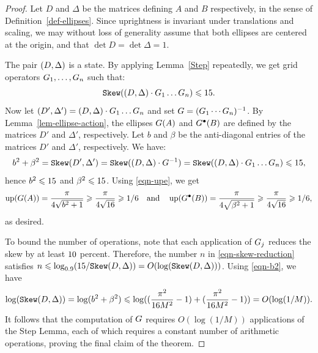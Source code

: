 \begin{proof}
  Let $D$ and $\Delta$ be the matrices defining $A$ and $B$
  respectively, in the sense of Definition~\ref{def-ellipses}. Since
  uprightness is invariant under translations and scaling, we may
  without loss of generality assume that both ellipses are centered at
  the origin, and that $\det D = \det \Delta = 1$.

  The pair $(D,\Delta)$ is a state. By applying Lemma~\ref{Step}
  repeatedly, we get grid operators $G_1,\ldots,G_n$ such that:
  \begin{equation}\label{eqn-skew-reduction}
    \sk(\state\cdot \G_1\ldots \G_n) \leq \formula{\P}.
  \end{equation}
  Now let $(D',\Delta')=(D,\Delta)\cdot G_1\ldots G_n$ and set
  $G=(G_1\cdots G_n)^{-1}$. By Lemma~\ref{lem-ellipse-action}, the
  ellipses $G(A)$ and $G^{\bullet}(B)$ are defined by the matrices
  $D'$ and $\Delta'$, respectively.  Let $b$ and $\beta$ be the
  anti-diagonal entries of the matrices $D'$ and $\Delta'$,
  respectively.  We have:
  \[
  b^2+\beta^2  = \sk (D',\Delta')=
  \sk(\state\cdot \G\inv) =
  \sk (\state\cdot \G_1\ldots \G_n)\leq \formula{\P},
  \]
  hence $b^2\leq \formula{\P}$ and $\beta^2\leq\formula{\P}$.
  Using {\eqref{eqn-upe}}, we get
  \[
  \up(\G(A)) 
  = \frac{\pi}{4\sqrt{b^2+1}} 
  \geq \frac{\pi}{4\sqrt{\formula{\P+1}}}
  \geq 1/\formula{\oneoverM} 
  \quad\mbox{and}\quad
  \up(\G\bul(B)) 
  = \frac{\pi}{4\sqrt{\beta^2+1}} 
  \geq \frac{\pi}{4\sqrt{\formula{\P+1}}} 
  \geq 1/\formula{\oneoverM},
  \]
  as desired. 

  To bound the number of operations, note that each application of
  $G_j$ reduces the skew by at least $\formula{\roundone{100-100*\Qstep}}$ percent.
  Therefore, the number $n$ in {\eqref{eqn-skew-reduction}} satisfies
  $n\leq \log_{\formula{\Qstep}}({\formula{\P}}/{\sk\state}) =
  O(\log(\sk\state))$.  Using {\eqref{eqn-b2}}, we have
  \[ \log (\mathtt{Skew}(D,\Delta)) = \log (b^2+\beta^2)
  \leqslant \log ((\frac{\pi^2}{16M^2} - 1) + (\frac{\pi^2}{16M^2} - 1))
  = O(\log(1/M)).
  \]
  It follows that the computation of $G$ requires
  $O(\log(1/M))$ applications of the Step Lemma, each of
  which requires a constant number of arithmetic operations, proving
  the final claim of the theorem. 
\end{proof}

